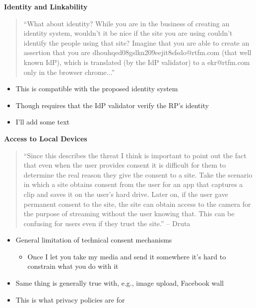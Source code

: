 \documentclass[helvetica]{seminar}
\newcommand{\heading}[1]{%
  \begin{center} 
    \large\bf 
    #1 
  \end{center} 
  \vspace{.4 in}}
\begin{document}
\begin{slide}
\heading{Identity and Linkability}

{\footnotesize
  \begin{quote}
``What about identity?  While you are in the business of creating an
identity system, wouldn't it be nice if the site you are using
couldn't identify the people using that site?  Imagine that you are
able to create an assertion that you are
dhouhqed08gslkn209eejit8sfsdo@rtfm.com (that well known IdP), which is
translated (by the IdP validator) to a ekr@rtfm.com only in the
browser chrome...''
\end{quote}}
                        
\begin{itemize}
\item This is compatible with the proposed identity system
\item Though requires that the IdP validator verify the RP's identity
\item I'll add some text
\end{itemize}
\end{slide}


\begin{slide}
\heading{Access to Local Devices}

\vspace{-.25in}
{\footnotesize
\begin{quote}
``Since this describes the threat I think is important to point out
the fact that even when the user provides consent it is difficult
for them to determine the real reason they give the consent to a
site. Take the scenario in which a site obtains consent from the
user for an app that captures a clip and saves it on the user's hard
drive. Later on, if the user gave permanent consent to the site, the
site can obtain access to the camera for the purpose of streaming
without the user knowing that. This can be confusing for users even
if they trust the site.'' -- Druta
\end{quote}
}

\begin{itemize}
\item General limitation of technical consent mechanisms
  \begin{itemize}
  \item Once I let you take my media and send it somewhere it's
    hard to constrain what you do with it
   \end{itemize}

 \item Same thing is generally true with, e.g., image upload, Facebook wall
 \item This is what privacy policies are for
\end{itemize}

\end{slide}
\end{document}

